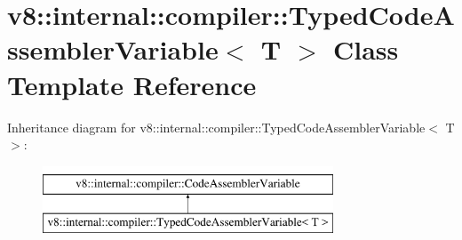 \hypertarget{classv8_1_1internal_1_1compiler_1_1TypedCodeAssemblerVariable}{}\section{v8\+:\+:internal\+:\+:compiler\+:\+:Typed\+Code\+Assembler\+Variable$<$ T $>$ Class Template Reference}
\label{classv8_1_1internal_1_1compiler_1_1TypedCodeAssemblerVariable}
Inheritance diagram for v8\+:\+:internal\+:\+:compiler\+:\+:Typed\+Code\+Assembler\+Variable$<$ T $>$\+:\begin{figure}[H]
\begin{center}
\leavevmode
\includegraphics[height=2.000000cm]{classv8_1_1internal_1_1compiler_1_1TypedCodeAssemblerVariable}
\end{center}
\end{figure}
